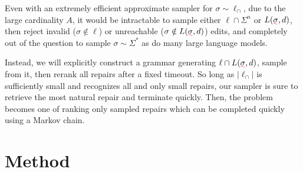 \documentclass[sigplan,review,anonymous,acmsmall]{acmart}\settopmatter{printfolios=false,printccs=false,printacmref=false}
\begin{document}
  Even with an extremely efficient approximate sampler for $\sigma \sim \ell_\cap$, due to the large cardinality $A$, it would be intractable to sample either $\ell\cap\Sigma^n$ or $L(\err\sigma, d)$, then reject invalid ($\sigma \notin \ell$) or unreachable ($\sigma \notin L(\err\sigma, d)$) edits, and completely out of the question to sample $\sigma \sim \Sigma^*$ as do many large language models.

  Instead, we will explicitly construct a grammar generating $\ell \cap L(\err\sigma, d)$, sample from it, then rerank all repairs after a fixed timeout. So long as $|\ell_\cap|$ is sufficiently small and recognizes all and only small repairs, our sampler is sure to retrieve the most natural repair and terminate quickly. Then, the problem becomes one of ranking only sampled repairs which can be completed quickly using a Markov chain.

  \section{Method}
\end{document}

